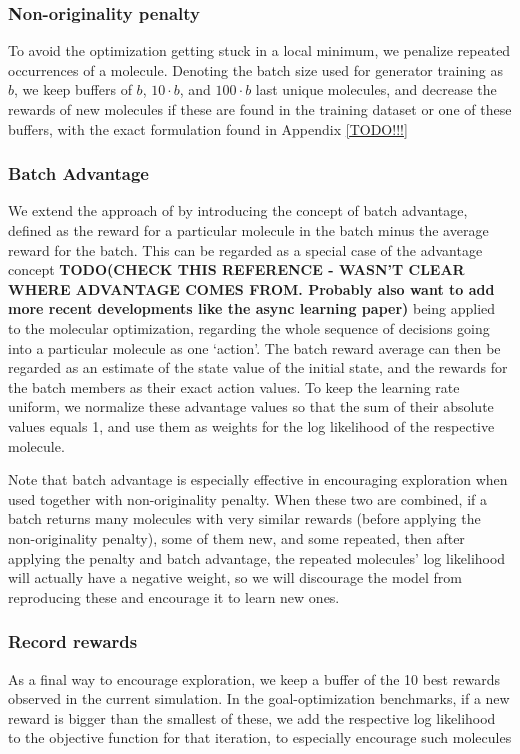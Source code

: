 \documentclass{article}
\newcommand{\TODO}[1]{{\bf TODO(#1)}}
\begin{document}
\subsubsection{Non-originality penalty}
To avoid the optimization getting stuck in a local minimum, we penalize repeated occurrences of a molecule. Denoting the batch size used for generator training as $b$, we keep buffers of $b$, $10\cdot b$, and $100\cdot b$ last unique molecules, and decrease the rewards of new molecules if these are found in the training dataset or one of these buffers, with the exact formulation found in Appendix \ref{TODO!!!}

\subsubsection{Batch Advantage}
We extend the approach of \cite{segler2017} by introducing the concept of batch advantage, defined as the reward for a particular molecule in the batch minus the average reward for the batch. This can be regarded as a special case of the advantage concept \cite{baird1994} \TODO{CHECK THIS REFERENCE - WASN'T CLEAR WHERE ADVANTAGE COMES FROM. Probably also want to add more recent developments like the async learning paper} being applied to the molecular optimization, regarding the whole sequence of decisions going into a particular molecule as one `action'. The batch reward average can then be regarded as an estimate of the state value of the initial state, and the rewards for the batch members as their exact action values. To keep the learning rate uniform, we normalize these advantage values so that the sum of their absolute values equals 1, and use them as weights for the log likelihood of the respective molecule.

Note that batch advantage is especially effective in encouraging exploration when used together with non-originality penalty. When these two are combined, if a batch returns many molecules with very similar rewards (before applying the non-originality penalty), some of them new, and some repeated, then after applying the penalty and batch advantage, the repeated molecules' log likelihood will actually have a negative weight, so we will discourage the model from reproducing these and encourage it to learn new ones.

\subsubsection{Record rewards}
As a final way to encourage exploration, we keep a buffer of the 10 best rewards observed in the current simulation. In the goal-optimization benchmarks, if a new reward is bigger than the smallest of these, we add the respective log likelihood to the objective function for that iteration, to especially encourage such molecules
\end{document}
